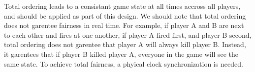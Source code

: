 Total ordering leads to a consistant game state at all times accross all players, and should be applied as part of this design. We should note that total ordering does not garentee fairness in real time. For example, if player A and B are next to each other and fires at one another, if player A fired first, and player B second, total ordering does not garentee that player A will always kill player B. Instead, it garentees that if player B killed player A, everyone in the game will see the same state. To achieve total fairness, a phyical clock synchronization is needed.

